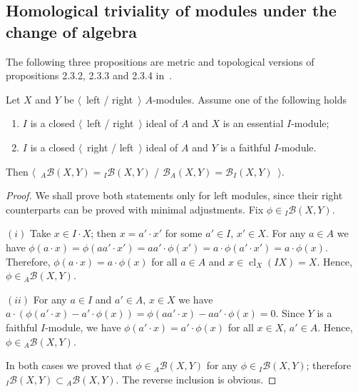 
\subsection{
    Homological triviality of modules under the change of algebra}\label{
SubSectionHomologicalTrivialityOfModulesUnderChangeOfAlgebra}

The following three propositions are metric and topological versions of
propositions 2.3.2, 2.3.3 and 2.3.4 in~\cite{RamsHomPropSemgroupAlg}.

\begin{proposition}\label{MorphCoincide} Let $X$ and $Y$ be $\langle$~left /
right~$\rangle$ $A$-modules. Assume one of the following holds

\begin{enumerate}[label = (\roman*)]
    \item $I$ is a closed $\langle$~left / right~$\rangle$ ideal of $A$ and $X$ is an
    essential $I$-module;

    \item $I$ is a closed $\langle$~right / left~$\rangle$ ideal of $A$ and $Y$ is a
    faithful $I$-module. 
\end{enumerate}

Then $\langle$~${}_A\mathcal{B}(X,Y)={}_I\mathcal{B}(X,Y)$ /
$\mathcal{B}_A(X,Y)=\mathcal{B}_I(X,Y)$~$\rangle$.
\end{proposition}
\begin{proof} We shall prove both statements only for left modules, since their
right counterparts can be proved with minimal adjustments. 
Fix $\phi\in{}_I\mathcal{B}(X,Y)$.

$(i)$ Take $x\in I\cdot X$; then $x=a'\cdot x'$ for some $a'\in I$, $x'\in X$.
For any $a\in A$ we have $\phi(a\cdot x)=\phi(aa'\cdot
x')=aa'\cdot\phi(x')=a\cdot\phi(a'\cdot x')=a\cdot\phi(x)$. Therefore,
$\phi(a\cdot x)=a\cdot\phi(x)$ for all $a\in A$ 
and $x\in \operatorname{cl}_X(IX)=X$. Hence, $\phi\in {}_A\mathcal{B}(X,Y)$.

$(ii)$ For any $a\in I$ and $a'\in A$, $x\in X$ we have $a\cdot(\phi(a'\cdot
x)-a'\cdot\phi(x))=\phi(aa'\cdot x)-aa'\cdot\phi(x)=0$. Since $Y$ is a faithful
$I$-module, we have $\phi(a'\cdot x)=a'\cdot \phi(x)$ for all $x\in X$, 
$a'\in A$. Hence, $\phi\in{}_A\mathcal{B}(X,Y)$.

In both cases we proved that $\phi\in{}_A\mathcal{B}(X,Y)$ for any
$\phi\in{}_I\mathcal{B}(X,Y)$; 
therefore ${}_I\mathcal{B}(X,Y)\subset {}_A\mathcal{B}(X,Y)$. 
The reverse inclusion is obvious.
\end{proof}

